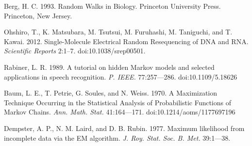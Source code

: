 \documentclass{biophys_letter}
\begin{document}
\begin{thebibliography}{99}
  Berg, H. C.
  1993.
  Random Walks in Biology.
  Princeton University Press.
  Princeton, New Jersey.

  Ohshiro, T., K. Matsubara, M. Tsutsui, M. Furuhashi, M. Taniguchi, and T. Kawai. 
  2012.
  Single-Molecule Electrical Random Resequencing of DNA and RNA.
  {\it Scientific Reports} 
  2:1--7.
  doi:10.1038/srep00501.

  Rabiner, L. R.
  1989.
  A tutorial on hidden Markov models and selected applications in speech recognition.
  {\it P. IEEE.}
  77:257---286.
  doi:10.1109/5.18626

  Baum, L. E., T. Petrie, G. Soules, and N. Weiss. 
  1970.
  A Maximization Technique Occurring in the Statistical Analysis of Probabilistic Functions of Markov Chains.
  {\it Ann. Math. Stat.}
  41:164---171.
  doi:10.1214/aoms/1177697196

  Dempster, A. P., N. M. Laird, and D. B. Rubin.
  1977.
  Maximum likelihood from incomplete data via the EM algorithm.
  {\it J. Roy. Stat. Soc. B. Met.}
  39:1---38.

\end{thebibliography}
\end{document}
